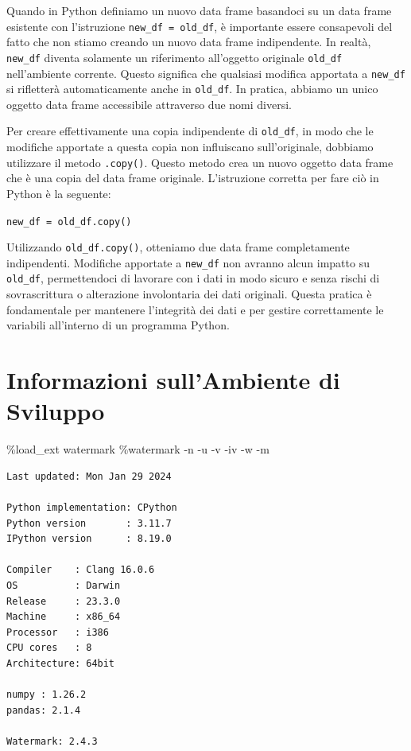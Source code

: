 \documentclass[
  letterpaper,
  krantz2]{{[}./krantz{]}}
\newenvironment{Shaded}{\begin{snugshade}}{\end{snugshade}}
\newcommand{\NormalTok}[1]{\textcolor[rgb]{0.00,0.23,0.31}{#1}}
\newcommand{\OperatorTok}[1]{\textcolor[rgb]{0.37,0.37,0.37}{#1}}
\begin{document}
Quando in Python definiamo un nuovo data frame basandoci su un data
frame esistente con l'istruzione \texttt{new\_df\ =\ old\_df}, è
importante essere consapevoli del fatto che non stiamo creando un nuovo
data frame indipendente. In realtà, \texttt{new\_df} diventa solamente
un riferimento all'oggetto originale \texttt{old\_df} nell'ambiente
corrente. Questo significa che qualsiasi modifica apportata a
\texttt{new\_df} si rifletterà automaticamente anche in
\texttt{old\_df}. In pratica, abbiamo un unico oggetto data frame
accessibile attraverso due nomi diversi.

Per creare effettivamente una copia indipendente di \texttt{old\_df}, in
modo che le modifiche apportate a questa copia non influiscano
sull'originale, dobbiamo utilizzare il metodo \texttt{.copy()}. Questo
metodo crea un nuovo oggetto data frame che è una copia del data frame
originale. L'istruzione corretta per fare ciò in Python è la seguente:

\texttt{new\_df\ =\ old\_df.copy()}

Utilizzando \texttt{old\_df.copy()}, otteniamo due data frame
completamente indipendenti. Modifiche apportate a \texttt{new\_df} non
avranno alcun impatto su \texttt{old\_df}, permettendoci di lavorare con
i dati in modo sicuro e senza rischi di sovrascrittura o alterazione
involontaria dei dati originali. Questa pratica è fondamentale per
mantenere l'integrità dei dati e per gestire correttamente le variabili
all'interno di un programma Python.

\section{Informazioni sull'Ambiente di
Sviluppo}\label{informazioni-sullambiente-di-sviluppo-3}

\begin{Shaded}
\begin{Highlighting}[]
\OperatorTok{\%}\NormalTok{load\_ext watermark}
\OperatorTok{\%}\NormalTok{watermark }\OperatorTok{{-}}\NormalTok{n }\OperatorTok{{-}}\NormalTok{u }\OperatorTok{{-}}\NormalTok{v }\OperatorTok{{-}}\NormalTok{iv }\OperatorTok{{-}}\NormalTok{w }\OperatorTok{{-}}\NormalTok{m}
\end{Highlighting}
\end{Shaded}

\begin{verbatim}
Last updated: Mon Jan 29 2024

Python implementation: CPython
Python version       : 3.11.7
IPython version      : 8.19.0

Compiler    : Clang 16.0.6 
OS          : Darwin
Release     : 23.3.0
Machine     : x86_64
Processor   : i386
CPU cores   : 8
Architecture: 64bit

numpy : 1.26.2
pandas: 2.1.4

Watermark: 2.4.3
\end{verbatim}
\end{document}
